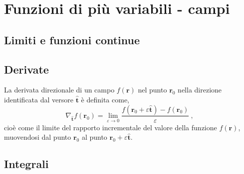 \begin{definition}[Coordinate]
\end{definition}
\begin{example}
\end{example}
\begin{example}
\end{example}
\begin{example}
\end{example}

\section{Funzioni di più variabili - campi}
\subsection{Limiti e funzioni continue}

\subsection{Derivate}
\begin{definition}
\end{definition}
\begin{definition} La derivata direzionale di un campo $f(\mathbf{r})$ nel punto $\mathbf{r}_0$ nella direzione identificata dal versore $\mathbf{\hat{t}}$ è definita come,
    \begin{equation}
        \nabla_{\mathbf{\hat{t}}} f(\mathbf{r}_0) = \lim_{\varepsilon \rightarrow 0} \dfrac{f(\mathbf{r}_0+\varepsilon \mathbf{\hat{t}})-f(\mathbf{r}_0)}{\varepsilon} \ ,
    \end{equation}
    cioè come il limite del rapporto incrementale del valore della funzione $f(\mathbf{r})$, muovendosi dal punto $\mathbf{r}_0$ al punto $\mathbf{r}_0 + \varepsilon \mathbf{\hat{t}}$.
\end{definition}

\subsection{Integrali}
